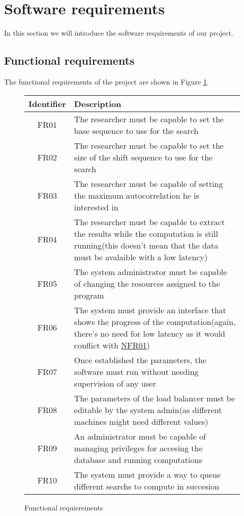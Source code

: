 \section{Software requirements}

In this section we will introduce the software requirements of our project.

\subsection{Functional requirements}

The functional requirements of the project are shown in Figure
\ref{functional:fig}.


\begin{figure}[ht!]

  \begin{center}
    \begin{tabular}{||c | p{12cm}||}
      \hline
      Identifier & Description \\
      \hline
      \hline
      FR01 \label{FR01} & The researcher must be capable to set the base
      sequence to use for the search \\
      \hline
      FR02 \label{FR02} & The researcher must be capable to set the size
      of the shift sequence to use for the search\\
      \hline
      FR03 \label{FR03} & The researcher must be capable of setting the maximum
      autocorrelation he is interested in \\
      \hline
      FR04 \label{FR04} & The researcher must be capable to extract the
      results while the computation is still running(this doesn't mean that
      the data must be avalaible with a low latency)\\
      \hline
      FR05 \label{FR05} & The system administrator must be capable of changing
      the resources assigned to the program\\
      \hline
      FR06 \label{FR06} & The system must provide an interface that shows
      the progress of the computation(again, there's no need for low latency
      as it would conflict with \hyperref[NFR01]{NFR01})\\
      \hline
      FR07 \label{FR07} & Once established the parameters, the software must
      run without needing supervision of any user \\
      \hline
      FR08 \label{FR08} & The parameters of the load balancer must be editable
      by the system admin(as different machines might need different values) \\
      \hline
      FR09 \label{FR09} & An administrator must be capable of managing
      privileges for accesing the database and running computations\\
      \hline
      FR10 \label{FR10} & The system must provide a way to queue different
      searchs to compute in succesion\\
      \hline
    \end{tabular}
  \end{center}

  \caption{Functional requierements}
  \label{functional:fig}
\end{figure}

